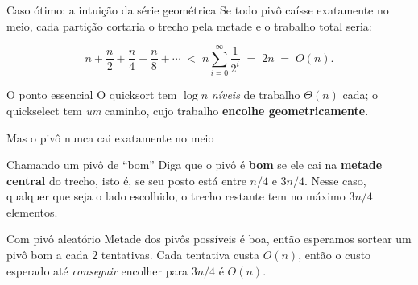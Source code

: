 \documentclass[aspectratio=169]{beamer}
\begin{document}
\begin{frame}[shrink=20]{Caso ótimo: a intuição da série geométrica}
  Se todo pivô caísse exatamente no meio, cada partição cortaria o trecho pela
  metade e o trabalho total seria:

  \begin{center}
  \end{center}

  \[
    n + \frac{n}{2} + \frac{n}{4} + \frac{n}{8} + \cdots
    \;<\; n \sum_{i=0}^{\infty} \frac{1}{2^i} \;=\; 2n \;=\; O(n).
  \]

  \begin{block}{O ponto essencial}
    O quicksort tem $\log n$ \emph{níveis} de trabalho $\Theta(n)$ cada; o
    quickselect tem \emph{um} caminho, cujo trabalho \textbf{encolhe
    geometricamente}.
  \end{block}
\end{frame}

\begin{frame}{Mas o pivô nunca cai exatamente no meio}
  \begin{block}{Chamando um pivô de ``bom''}
    Diga que o pivô é \textbf{bom} se ele cai na \textbf{metade central} do
    trecho, isto é, se seu posto está entre $n/4$ e $3n/4$. Nesse caso,
    qualquer que seja o lado escolhido, o trecho restante tem no máximo
    $3n/4$ elementos.
  \end{block}

  \begin{center}
  \end{center}

  \begin{block}{Com pivô aleatório}
    Metade dos pivôs possíveis é boa, então esperamos sortear um pivô bom a
    cada $2$ tentativas. Cada tentativa custa $O(n)$, então o custo esperado
    até \emph{conseguir} encolher para $3n/4$ é $O(n)$.
  \end{block}
\end{frame}
\end{document}
